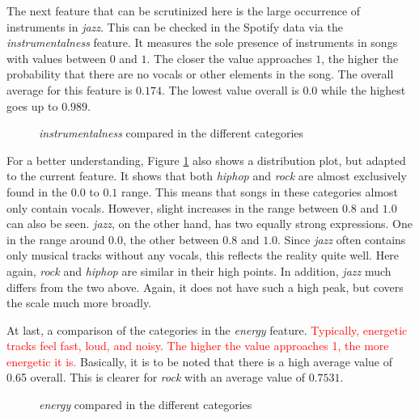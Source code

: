 The next feature that can be scrutinized here is the large occurrence of instruments in \emph{jazz}.
This can be checked in the Spotify data via the \emph{instrumentalness} feature.
It measures the sole presence of instruments in songs with values between \(0\) and \(1\).
The closer the value approaches \(1\), the higher the probability that there are no vocals or other
elements in the song. The overall average for this feature is \(0.174\).
The lowest value overall is \(0.0\) while the highest goes up to \(0.989\).

\begin{figure}[H]
    \centering
    \qquad
    \caption{\emph{instrumentalness} compared in the different categories}%
    \label{fig:du_dp_bp_instr_categorie_dependent}%
\end{figure}

For a better understanding, Figure \ref{fig:du_dp_bp_instr_categorie_dependent}  also shows a distribution plot,
but adapted to the current feature.
It shows that both \emph{\emph{hiphop}} and \emph{rock} are almost exclusively found in the \(0.0\) to \(0.1\) range.
This means that songs in these categories almost only contain vocals.
However, slight increases in the range between \(0.8\) and \(1.0\) can also be seen. \emph{jazz},
on the other hand, has two equally strong expressions. One in the range around \(0.0\),
the other between \(0.8\) and \(1.0\). Since \emph{jazz} often contains only musical tracks without
any vocals, this reflects the reality quite well.
Here again, \emph{rock} and \emph{\emph{hiphop}} are similar in their high points.
In addition, \emph{jazz} much differs from the two above. Again, it does not have such a high peak, 
but covers the scale much more broadly.

At last, a comparison of the categories in the \emph{energy} feature.
\textcolor{red}{Typically, energetic tracks feel fast, loud, and noisy.
The higher the value approaches 1, the more energetic it is.}
Basically, it is to be noted that there is a high average value of 0.65 overall.
This is clearer for \emph{rock} with an average value of \(0.7531\).

\begin{figure}[H]
    \centering
    \qquad
    \caption{\emph{energy} compared in the different categories}%
    \label{fig:du_dp_bp_enrg_categorie_dependent}%
\end{figure}

